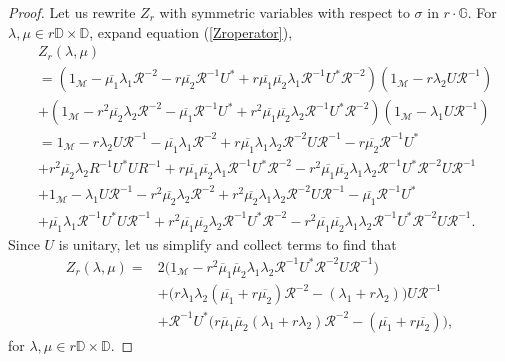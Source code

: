 \documentclass[12pt,reqno]{amsart}
\numberwithin{equation}{section}
\theoremstyle{definition}
\begin{document}
\begin{proof}
Let us rewrite $Z_{r}$ with symmetric variables with respect to $\sigma$ in $r \cdot \mathbb{G}$.
For $\lambda, \mu \in r\mathbb{D}\times\mathbb{D}$, expand equation (\ref{Zroperator}),
\begin{align*}
&Z_{r}(\lambda,\mu) \\
&= (1_{\mathcal{M}}-\overline{\mu_{1}}\lambda_{1}\mathcal{R}^{-2}-r\overline{\mu_{2}}\mathcal{R}^{-1}U^{*} + r\overline{\mu_{1}}\overline{\mu_{2}}\lambda_{1}\mathcal{R}^{-1}U^{*}\mathcal{R}^{-2})(1_{\mathcal{M}}-r\lambda_{2}U\mathcal{R}^{-1})\\
&+(1_{\mathcal{M}}-r^{2}\overline{\mu_{2}}\lambda_{2}\mathcal{R}^{-2}-\overline{\mu_{1}}\mathcal{R}^{-1}U^{*}+r^{2}\overline{\mu_{1}}\overline{\mu_{2}}\lambda_{2}\mathcal{R}^{-1}U^{*}\mathcal{R}^{-2})(1_{\mathcal{M}}-\lambda_{1}U\mathcal{R}^{-1})\\
&= 1_{\mathcal{M}}-r\lambda_{2}U\mathcal{R}^{-1}-\overline{\mu_{1}}\lambda_{1}\mathcal{R}^{-2}+r\overline{\mu_{1}}\lambda_{1}\lambda_{2}\mathcal{R}^{-2}U\mathcal{R}^{-1}-r\overline{\mu_{2}}\mathcal{R}^{-1}U^{*}\\
&+r^{2}\overline{\mu_{2}}\lambda_{2}R^{-1}U^{*}UR^{-1}+r\overline{\mu_{1}}\overline{\mu_{2}}\lambda_{1}\mathcal{R}^{-1}U^{*}\mathcal{R}^{-2}-r^{2}\overline{\mu_{1}}\overline{\mu_{2}}\lambda_{1}\lambda_{2}\mathcal{R}^{-1}U^{*}\mathcal{R}^{-2}U\mathcal{R}^{-1}\\
&+1_{\mathcal{M}}-\lambda_{1}U\mathcal{R}^{-1}-r^{2}\overline{\mu_{2}}\lambda_{2}\mathcal{R}^{-2}+r^{2}\overline{\mu_{2}}\lambda_{1}\lambda_{2}\mathcal{R}^{-2}U\mathcal{R}^{-1}-\overline{\mu_{1}}\mathcal{R}^{-1}U^{*}\\
&+\overline{\mu_{1}}\lambda_{1}\mathcal{R}^{-1}U^{*}U\mathcal{R}^{-1}+r^{2}\overline{\mu_{1}}\overline{\mu_{2}}\lambda_{2}\mathcal{R}^{-1} U^{*}\mathcal{R}^{-2}-r^{2}\overline{\mu_{1}}\overline{\mu_{2}}\lambda_{1}\lambda_{2}\mathcal{R}^{-1}U^{*}\mathcal{R}^{-2} U \mathcal{R}^{-1}.
\end{align*}
Since $U$ is unitary, let us simplify and collect terms to find that 
\begin{align}
Z_{r}(\lambda,\mu) = &2\Big(1_{\mathcal{M}}-r^{2}\overline{\mu}_{1}\overline{\mu}_{2}\lambda_{1}\lambda_{2}\mathcal{R}^{-1}U^{*}\mathcal{R}^{-2}U\mathcal{R}^{-1}\Big)  \nonumber \\
&+\Big( r\lambda_{1}\lambda_{2}(\overline{\mu_{1}}+r\overline{\mu_{2}})\mathcal{R}^{-2}-(\lambda_{1}+r\lambda_{2})\Big)U\mathcal{R}^{-1}  \nonumber\\
&+\mathcal{R}^{-1}U^{*}\Big(r\overline{\mu}_{1} \overline{\mu}_{2}(\lambda_{1}+r\lambda_{2})\mathcal{R}^{-2}-(\overline{\mu_{1}}+r\overline{\mu_{2}})\Big),  \label{Zrnewform}
\end{align}
 for $\lambda,\mu \in r\mathbb{D}\times\mathbb{D}$.


\end{proof}
\end{document}
